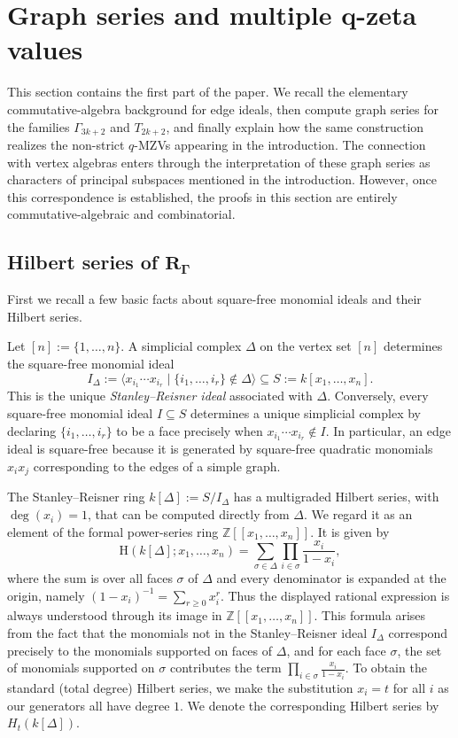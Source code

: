 \documentclass[pdftex]{sigma}
\numberwithin{equation}{section}
\theoremstyle{definition}
\begin{document}
\section[Graph series and multiple q-zeta values]{Graph series and multiple $\boldsymbol{q}$-zeta values}\label{section2}

This section contains the first part of the paper. We recall the elementary
commutative-algebra background for edge ideals, then compute graph series for
the families $\Gamma_{3k+2}$ and $T_{2k+2}$, and finally explain how the same
construction realizes the non-strict $q$-MZVs appearing in the introduction.
The connection with vertex algebras enters through the interpretation of these
graph series as characters of principal subspaces mentioned in the introduction. However, once this
correspondence is established, the proofs in this section are entirely
commutative-algebraic and combinatorial.

\subsection[Hilbert series of R\_Gamma]{Hilbert series of $\boldsymbol{R_{\Gamma}}$}\label{section2.1}

First we recall a few basic facts about square-free monomial ideals and their Hilbert series.

Let $[n]:=\{1,\dots,n\}$. A simplicial complex $\Delta$ on the vertex set $[n]$ determines the square-free monomial ideal
\[
I_{\Delta}:=\bigl\langle x_{i_1}\cdots x_{i_r}\mid \{i_1,\dots,i_r\}\notin\Delta\bigr\rangle
\subseteq S:=k[x_1,\dots,x_n].
\]
This is the unique \emph{Stanley--Reisner ideal} associated with $\Delta$. Conversely, every square-free monomial ideal $I\subseteq S$ determines a unique simplicial complex by declaring $\{i_1,\dots,i_r\}$ to be a face precisely when $x_{i_1}\cdots x_{i_r}\notin I$. In particular, an edge ideal is square-free because it is generated by square-free quadratic monomials $x_ix_j$ corresponding to the edges of a simple graph.

The Stanley--Reisner ring $k[\Delta]:=S/I_{\Delta}$ has a multigraded Hilbert series, with $\deg (x_i)=1$, that can be computed directly from $\Delta$. We regard it as an element of the formal power-series ring $\mathbb{Z}[[x_1,\dots,x_n]]$. It is given by
\[
\mathrm{H}(k[\Delta]; x_1, \dots, x_n) = \sum_{\sigma \in \Delta} \prod_{i \in \sigma} \frac{x_i}{1 - x_i},
\]
where the sum is over all faces $\sigma$ of $\Delta$ and every denominator is expanded at the origin, namely $(1-x_i)^{-1}=\sum_{r\geq0}x_i^r$. Thus the displayed rational expression is always understood through its image in $\mathbb{Z}[[x_1,\dots,x_n]]$. This formula arises from the fact that the monomials not in the Stanley--Reisner ideal $I_\Delta$ correspond precisely to the monomials supported on faces of $\Delta$, and for each face $\sigma$, the set of monomials supported on $\sigma$ contributes the term $\prod_{i \in \sigma} \frac{x_i}{1 - x_i}$. To obtain the standard (total degree) Hilbert series, we make the substitution $x_i = t$ for all $i$ as our generators all have degree $1$. We denote the corresponding Hilbert series by $H_t(k[\Delta])$.
\end{document}

